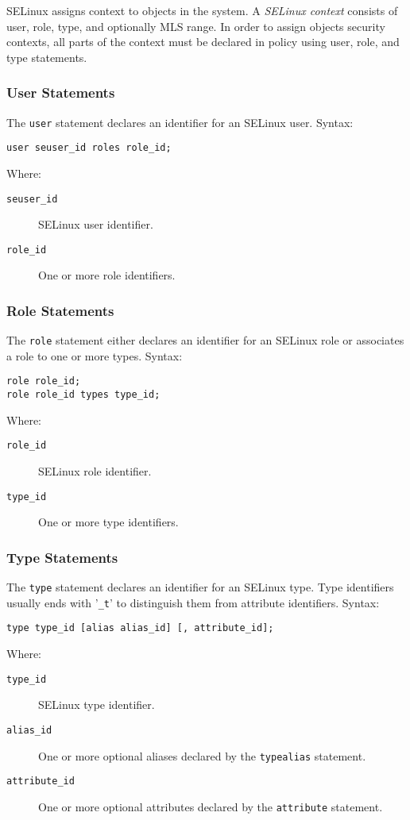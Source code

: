 SELinux assigns context to objects in the system. A \emph{SELinux context}
consists of user, role, type, and optionally MLS range. In order to assign
objects security contexts, all parts of the context must be declared in policy
using user, role, and type statements.

\subsubsection{User Statements}
The \texttt{user} statement declares an identifier for an SELinux user. Syntax:
\begin{lstlisting}
user seuser_id roles role_id;
\end{lstlisting}
Where:
\begin{description}
    \item [\texttt{seuser\_id}] SELinux user identifier.
    \item [\texttt{role\_id}] One or more role identifiers.
\end{description}


\subsubsection{Role Statements}
The \texttt{role} statement either declares an identifier for an SELinux role or
associates a role to one or more types. Syntax:
\begin{lstlisting}
role role_id;
role role_id types type_id;
\end{lstlisting}
Where:
\begin{description}
    \item [\texttt{role\_id}] SELinux role identifier.
    \item [\texttt{type\_id}] One or more type identifiers.
\end{description}


\subsubsection{Type Statements}
The \texttt{type} statement declares an identifier for an SELinux type. Type
identifiers usually ends with '\texttt{\_t}' to distinguish them from attribute
identifiers. Syntax:
\begin{lstlisting}
type type_id [alias alias_id] [, attribute_id];
\end{lstlisting}
Where:
\begin{description}
    \item [\texttt{type\_id}] SELinux type identifier.
    \item [\texttt{alias\_id}] One or more optional aliases declared by the
        \texttt{typealias} statement.
    \item [\texttt{attribute\_id}] One or more optional attributes declared by
        the \texttt{attribute} statement.
\end{description}

